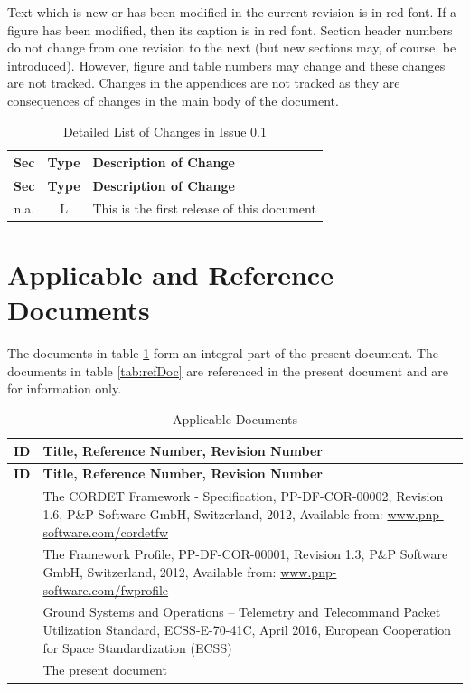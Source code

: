 \documentclass[a4paper,10pt]{article}
\let\stdsection\section
\renewcommand\section{\newpage\stdsection}
\begin{document}
Text which is new or has been modified in the current revision is in red font. If a figure has been modified, then its caption is in red font. Section header numbers do not change from one revision to the next (but new sections may, of course, be introduced). However, figure and table numbers may change and these changes are not tracked. Changes in the appendices are not tracked as they are consequences of changes in the main body of the document.

\begin{longtable}{|c|c|p{10cm}|}
\caption{Detailed List of Changes in Issue 0.1} \\
\hline
\rowcolor{light-gray}
\textbf{Sec} & \textbf{Type} & \textbf{Description of Change} \\
\hline\hline
\endfirsthead
\rowcolor{light-gray}
\textbf{Sec} & \textbf{Type} & \textbf{Description of Change} \\
\hline\hline
\endhead
n.a. & L & This is the first release of this document \\
\hline
\end{longtable}






\newpage

\section{Applicable and Reference Documents}

The documents in table \ref{tab:appDoc} form an integral part of the present document. The documents in table \ref{tab:refDoc} are referenced in the present document and are for information only.

\begin{longtable}{|c|p{11cm}|}
\caption{Applicable Documents} \label{tab:appDoc}\\
\hline
\rowcolor{light-gray}
\textbf{ID} & \textbf{Title, Reference Number, Revision Number} \\
\hline\hline
\endfirsthead
\rowcolor{light-gray}
\textbf{ID} & \textbf{Title, Reference Number, Revision Number} \\
\hline\hline
\endhead
[CR-SP] & The CORDET Framework - Specification, PP-DF-COR-00002, Revision 1.6, P\&P Software GmbH, Switzerland, 2012, Available from: \url{www.pnp-software.com/cordetfw} \\
\hline
[FW-SP] & The Framework Profile, PP-DF-COR-00001, Revision 1.3, P\&P Software GmbH, Switzerland, 2012, Available from: \url{www.pnp-software.com/fwprofile} \\
\hline
[PS-SP] & Ground Systems and Operations – Telemetry and Telecommand Packet Utilization Standard, ECSS-E-70-41C, April 2016, European Cooperation for Space Standardization (ECSS) \\
\hline
[PX-SP] & The present document \\
\hline
\end{longtable}
\end{document}
